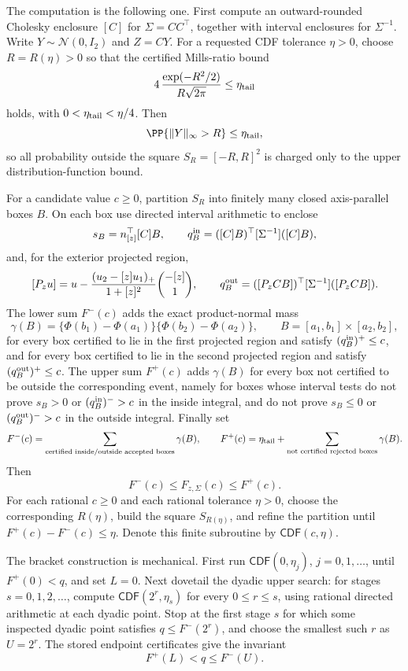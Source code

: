 \begin{algorithmiclemma}
The computation is the following one.  First compute an outward-rounded
Cholesky enclosure \([C]\) for \(\Sigma=C C^\top\), together with interval
enclosures for \(\Sigma^{-1}\).  Write \(Y\sim\mathcal N(0,I_2)\) and
\(Z=CY\).  For a requested CDF tolerance \(\eta>0\), choose \(R=R(\eta)>0\)
so that the certified Mills-ratio bound
\begin{equation}\label{eq:certified-gaussian-tail-truncation-main}
4\,\frac{\exp(-R^2/2)}{R\sqrt{2\pi}}\le\eta_{\rm tail}
\end{equation}
holds, with \(0<\eta_{\rm tail}<\eta/4\).  Then
\[
\PP\{\|Y\|_\infty>R\}\le\eta_{\rm tail},
\]
so all probability outside the square \(S_R=[-R,R]^2\) is charged only to the
upper distribution-function bound.

For a candidate value \(c\ge0\), partition \(S_R\) into finitely many closed
axis-parallel boxes \(B\).  On each box use directed interval arithmetic to
enclose
\[
s_B=n_{[z]}^\top [C]B,\qquad
q_B^{\rm in}=([C]B)^\top[\Sigma^{-1}]([C]B),
\]
and, for the exterior projected region,
\[
[P_z u]
=u-\frac{(u_2-[z]u_1)_+}{1+[z]^2}\binom{-[z]}{1},
\qquad
q_B^{\rm out}=([P_z C B])^\top[\Sigma^{-1}]([P_z C B]).
\]
The lower sum \(F^-(c)\) adds the exact product-normal mass
\[
\gamma(B)=
\{\Phi(b_1)-\Phi(a_1)\}\{\Phi(b_2)-\Phi(a_2)\},
\qquad B=[a_1,b_1]\times[a_2,b_2],
\]
for every box certified to lie in the first projected region and satisfy
\((q_B^{\rm in})^+\le c\), and for every box certified to lie in the second
projected region and satisfy \((q_B^{\rm out})^+\le c\).  The upper sum
\(F^+(c)\) adds \(\gamma(B)\) for every box not certified to be outside the
corresponding event, namely for boxes whose interval tests do not prove
\(s_B>0\) or \((q_B^{\rm in})^->c\) in the inside integral, and do not prove
\(s_B\le0\) or \((q_B^{\rm out})^->c\) in the outside integral.  Finally set
\[
F^-(c)=\sum_{\text{certified inside/outside accepted boxes}}\gamma(B),
\qquad
F^+(c)=\eta_{\rm tail}+\sum_{\text{not certified rejected boxes}}\gamma(B).
\]
Then
\[
F^-(c)\le F_{z,\Sigma}(c)\le F^+(c).
\]
For each rational \(c\ge0\) and each rational tolerance \(\eta>0\), choose
the corresponding \(R(\eta)\), build the square \(S_{R(\eta)}\), and refine
the partition until \(F^+(c)-F^-(c)\le\eta\).  Denote this finite subroutine
by \(\mathsf{CDF}(c,\eta)\).

The bracket construction is mechanical.  First run
\(\mathsf{CDF}(0,\eta_j)\), \(j=0,1,\ldots\), until \(F^+(0)<q\), and set
\(L=0\).  Next dovetail the dyadic upper search: for stages
\(s=0,1,2,\ldots\), compute \(\mathsf{CDF}(2^r,\eta_s)\) for every
\(0\le r\le s\), using rational directed arithmetic at each dyadic point.
Stop at the first stage \(s\) for which some inspected dyadic point satisfies
\(q\le F^-(2^r)\), and choose the smallest such \(r\) as \(U=2^r\).  The
stored endpoint certificates give the invariant
\[
F^+(L)<q\le F^-(U).
\]


\end{algorithmiclemma}
